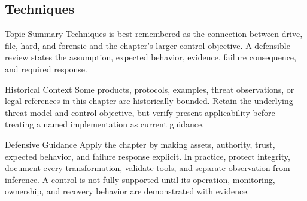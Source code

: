 \documentclass[11pt,letterpaper]{article}
\begin{document}
\subsection*{Techniques}
\begin{CornellNotesTable}
\end{CornellNotesTable}
\begin{CornellSummaryBox}{Topic Summary}
Techniques is best remembered as the connection between drive, file, hard, and forensic and the chapter's larger control objective. A defensible review states the assumption, expected behavior, evidence, failure consequence, and required response.
\end{CornellSummaryBox}
\begin{CornellWarningBox}{Historical Context}
Some products, protocols, examples, threat observations, or legal references in this chapter are historically bounded. Retain the underlying threat model and control objective, but verify present applicability before treating a named implementation as current guidance.
\end{CornellWarningBox}
\begin{CornellOverviewBox}{Defensive Guidance}
Apply the chapter by making assets, authority, trust, expected behavior, and failure response explicit. In practice, protect integrity, document every transformation, validate tools, and separate observation from inference. A control is not fully supported until its operation, monitoring, ownership, and recovery behavior are demonstrated with evidence.
\end{CornellOverviewBox}
\end{document}

